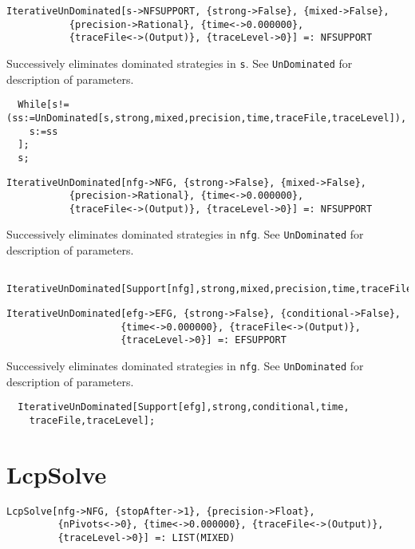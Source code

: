 \newsignature

\begin{verbatim}
IterativeUnDominated[s->NFSUPPORT, {strong->False}, {mixed->False}, 
           {precision->Rational}, {time<->0.000000}, 
           {traceFile<->(Output)}, {traceLevel->0}] =: NFSUPPORT 
\end{verbatim}

\noindent
Successively eliminates dominated strategies in \verb+s+. See
\verb+UnDominated+ for description of parameters.  

\udfbody
\begin{verbatim}
  While[s!=(ss:=UnDominated[s,strong,mixed,precision,time,traceFile,traceLevel]),
    s:=ss
  ];
  s;
\end{verbatim} 

\newsignature

\begin{verbatim}
IterativeUnDominated[nfg->NFG, {strong->False}, {mixed->False}, 
           {precision->Rational}, {time<->0.000000}, 
           {traceFile<->(Output)}, {traceLevel->0}] =: NFSUPPORT 
\end{verbatim}

\noindent
Successively eliminates dominated strategies in \verb+nfg+.  See
\verb+UnDominated+ for description of parameters.  

\udfbody
\begin{verbatim}
  IterativeUnDominated[Support[nfg],strong,mixed,precision,time,traceFile,traceLevel];
\end{verbatim} 

\newsignature

\begin{verbatim}
IterativeUnDominated[efg->EFG, {strong->False}, {conditional->False}, 
                    {time<->0.000000}, {traceFile<->(Output)}, 
                    {traceLevel->0}] =: EFSUPPORT 
\end{verbatim}

\noindent
Successively eliminates dominated strategies in \verb+nfg+. See
\verb+UnDominated+ for description of parameters.  

\udfbody
\begin{verbatim}
  IterativeUnDominated[Support[efg],strong,conditional,time,
    traceFile,traceLevel];
\end{verbatim} 




\section*{LcpSolve}\label{ExtLcpSolve}
\begin{verbatim}
LcpSolve[nfg->NFG, {stopAfter->1}, {precision->Float}, 
         {nPivots<->0}, {time<->0.000000}, {traceFile<->(Output)}, 
         {traceLevel->0}] =: LIST(MIXED) 
\end{verbatim}

